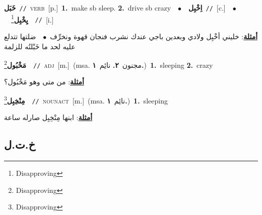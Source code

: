 \documentclass[10pt,a4paper,twoside]{article} %
\begin{document}
\begin{multicols}{2}
{\setlength\topsep{0pt}\textbf{\foreignlanguage{arabic}{خَبَل}}\ {\color{gray}\texttt{//}\color{black}}\ \textsc{verb}\ [p.]\ \textbf{1.}~make sb sleep.  \textbf{2.}~drive sb crazy\ \ $\bullet$\ \ \setlength\topsep{0pt}\textbf{\foreignlanguage{arabic}{اِخْبِل}}\ {\color{gray}\texttt{//}\color{black}}\ [c.]\ \ $\bullet$\ \ \setlength\topsep{0pt}\textbf{\foreignlanguage{arabic}{يِخْبِل}}\footnote{Disapproving}\ \ {\color{gray}\texttt{//}\color{black}}\ [i.]\  \begin{flushright}\color{gray}\foreignlanguage{arabic}{\textbf{\underline{\foreignlanguage{arabic}{أمثلة}}}: خليني أخْبِل ولادي وبعدين باجي عندك نشرب فنجان قهوة ونخرِّف\ $\bullet$\ \  ضلتها تتدلع عليه لحد ما خَبْلتُه للزلمة}\end{flushright}\color{black}} \vspace{2mm}

{\setlength\topsep{0pt}\textbf{\foreignlanguage{arabic}{مَخْبُول}}\footnote{Disapproving}\ \ {\color{gray}\texttt{//}\color{black}}\ \textsc{adj}\ [m.]\ \color{gray}(msa. \foreignlanguage{arabic}{مجنون}~\foreignlanguage{arabic}{\textbf{٢.}}  \foreignlanguage{arabic}{نائِم}~\foreignlanguage{arabic}{\textbf{١.}})\color{black}\ \textbf{1.}~sleeping  \textbf{2.}~crazy\  \begin{flushright}\color{gray}\foreignlanguage{arabic}{\textbf{\underline{\foreignlanguage{arabic}{أمثلة}}}: من متى وهو مَخْبُول؟}\end{flushright}\color{black}} \vspace{2mm}

{\setlength\topsep{0pt}\textbf{\foreignlanguage{arabic}{مِنْخِبِل}}\footnote{Disapproving}\ \ {\color{gray}\texttt{//}\color{black}}\ \textsc{noun\textunderscore act}\ [m.]\ \color{gray}(msa. \foreignlanguage{arabic}{نائِم}~\foreignlanguage{arabic}{\textbf{١.}})\color{black}\ \textbf{1.}~sleeping\  \begin{flushright}\color{gray}\foreignlanguage{arabic}{\textbf{\underline{\foreignlanguage{arabic}{أمثلة}}}: ابنها مِنْخِبِل صارله ساعة}\end{flushright}\color{black}} \vspace{2mm}

\vspace{-3mm}
\subsection*{\color{blue}\foreignlanguage{arabic}{خ.ت.ل}\color{blue}{}} 


\end{multicols}
\end{document}
